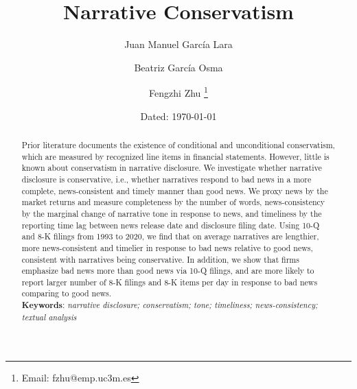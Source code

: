 \documentclass[a4paper]{article}
\begin{document}
	
	\title{Narrative Conservatism}

	\author{\vspace{1cm}Juan Manuel Garc\'ia Lara}
	
	\author{Beatriz Garc\'ia Osma}
	
	\author{Fengzhi Zhu%
		\thanks{Email: fzhu@emp.uc3m.es}}
	
	
	\date{\small Dated: \today}
	
	\maketitle
	
\thispagestyle{empty}
\begin{spacing}{2}

\begin{abstract}
	\begin{normalsize}
	\noindent
	Prior literature documents the existence of conditional and unconditional conservatism, which are measured by recognized line items in financial statements. However, little is known about conservatism in narrative disclosure. We investigate whether narrative disclosure is conservative, i.e., whether narratives respond to bad news in a more complete, news-consistent and timely manner than good news. We proxy news by the market returns and measure completeness by the number of words, news-consistency by the marginal change of narrative tone in response to news, and timeliness by the reporting time lag between news release date and disclosure filing date. Using 10-Q and 8-K filings from 1993 to 2020, we find that on average narratives are lengthier, more news-consistent and timelier in response to bad news relative to good news, consistent with narratives being conservative. In addition, we show that firms emphasize bad news more than good news via 10-Q filings, and are more likely to report larger number of 8-K filings and 8-K items per day in response to bad news comparing to good news.
	\\

	\noindent
	\textbf{Keywords}: \textit{narrative disclosure; conservatism; tone; timeliness; news-consistency; textual analysis}
	\end{normalsize}
\end{abstract}


\end{spacing}
\end{document}
